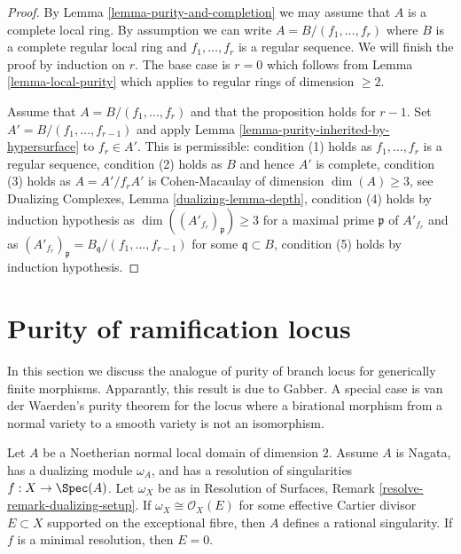 \begin{proof}
By Lemma \ref{lemma-purity-and-completion} we may assume that $A$ is
a complete local ring. By assumption we can write
$A = B/(f_1, \ldots, f_r)$ where $B$ is a complete regular local
ring and $f_1, \ldots, f_r$ is a regular sequence.
We will finish the proof by induction on $r$.
The base case is $r = 0$ which follows from
Lemma \ref{lemma-local-purity} which applies to
regular rings of dimension $\geq 2$.

\medskip\noindent
Assume that $A = B/(f_1, \ldots, f_r)$ and that the proposition
holds for $r - 1$. Set $A' = B/(f_1, \ldots, f_{r - 1})$ and apply
Lemma \ref{lemma-purity-inherited-by-hypersurface} to $f_r \in A'$.
This is permissible:
condition (1) holds as $f_1, \ldots, f_r$ is a regular sequence,
condition (2) holds as $B$ and hence $A'$ is complete,
condition (3) holds as $A = A'/f_r A'$ is Cohen-Macaulay of dimension
$\dim(A) \geq 3$, see Dualizing Complexes, Lemma \ref{dualizing-lemma-depth},
condition (4) holds by induction hypothesis as
$\dim((A'_{f_r})_\mathfrak p) \geq 3$ for a maximal
prime $\mathfrak p$ of $A'_{f_r}$ and as
$(A'_{f_r})_\mathfrak p = B_\mathfrak q/(f_1, \ldots, f_{r - 1})$
for some $\mathfrak q \subset B$,
condition (5) holds by induction hypothesis.
\end{proof}





\section{Purity of ramification locus}
\label{section-purity-ramification}

\noindent
In this section we discuss the analogue of purity of branch locus for
generically finite morphisms. Apparantly, this result is due to Gabber.
A special case is van der Waerden's purity theorem for the locus where
a birational morphism from a normal variety to a smooth variety is not
an isomorphism.

\begin{lemma}
\label{lemma-characterize-rational-singularity}
Let $A$ be a Noetherian normal local domain of dimension $2$.
Assume $A$ is Nagata, has a dualizing module $\omega_A$, and has a
resolution of singularities $f : X \to \Spec(A)$.
Let $\omega_X$ be as in Resolution of Surfaces,
Remark \ref{resolve-remark-dualizing-setup}.
If $\omega_X \cong \mathcal{O}_X(E)$ for some effective
Cartier divisor $E \subset X$ supported on the exceptional
fibre, then $A$ defines a rational singularity.
If $f$ is a minimal resolution, then $E = 0$.
\end{lemma}

